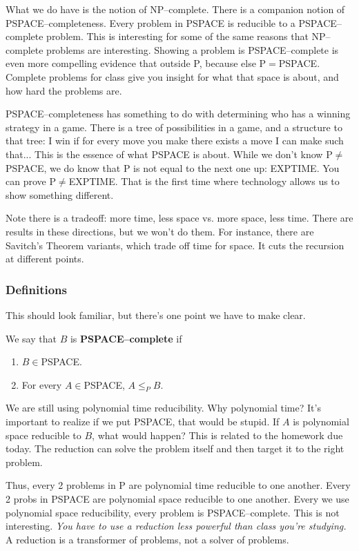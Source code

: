 What we do have is the notion of NP--complete. There is a companion notion of PSPACE--completeness. Every problem in PSPACE is reducible to a PSPACE--complete problem. This is interesting for some of the same reasons that NP--complete problems are interesting.
Showing a problem is PSPACE--complete is even more compelling evidence that outside P, because else P$=$PSPACE. Complete problems for class give you insight for what that space is about, and how hard the problems are.

PSPACE--completeness has something to do with determining who has a winning strategy in a game. There is a tree of possibilities in a game, and a structure to that tree: I win if for every move you make there exists a move I can make such that...
This is the essence of what PSPACE is about.
While we don't know P$\ne$PSPACE, we do know that P is not equal to the next one up: EXPTIME. You can prove P$\ne $EXPTIME. That is the first time where technology allows us to show something different.

Note there is a tradeoff: more time, less space vs. more space, less time. There are results in these directions, but we won't do them. For instance, there are Savitch's Theorem variants, which trade off time for space. It cuts the recursion at different points. 

\subsubsection{Definitions}
This should look familiar, but there's one point we have to make clear.
\begin{df}
We say that $B$ is \textbf{PSPACE--complete} if 
\begin{enumerate}
\item
$B\in $PSPACE.
\item
For every $A\in $PSPACE, $A\le_P B$.
\end{enumerate}
\end{df}
We are still using polynomial time reducibility. Why polynomial time? It's important to realize if we put PSPACE, {that would be stupid.} If $A$ is polynomial space reducible to $B$, what would happen? This is related to the homework due today. 
The reduction can solve the problem itself and then target it to the right problem.

Thus, every 2 problems in P are polynomial time reducible to one another. Every 2 probs in PSPACE are polynomial space reducible to one another. Every we use polynomial space reducibility, every problem is PSPACE--complete. This is not interesting.
{\it You have to use a reduction less powerful than class you're studying.} A reduction is a transformer of problems, not a solver of problems. 

